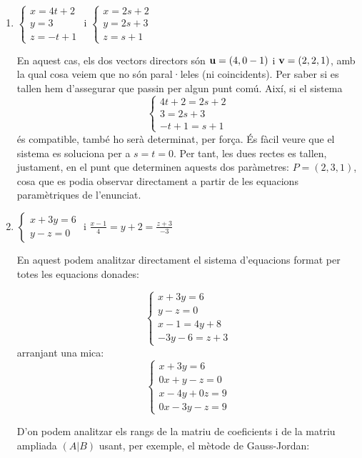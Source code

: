 \begin{enumerate}
  \item $\begin{cases}x=4t+2\\y=3\\z=-t+1\end{cases}$ i $\begin{cases}x=2s+2\\y=2s+3\\z=s+1\end{cases}$

En aquest cas, els dos vectors directors són $\textbf{u}=(4,0-1)$ i $\textbf{v}=(2,2,1)$, amb la qual cosa veiem que no són paral·leles (ni coincidents). Per saber si es tallen hem d'assegurar que passin per algun punt comú. Així, si el sistema
\[
\begin{cases}4t+2=2s+2\\3=2s+3\\-t+1=s+1\end{cases}
\]
és compatible, també ho serà determinat, per força. És fàcil veure que el sistema es soluciona per a $s=t=0$. Per tant, les dues rectes es tallen, justament, en el punt que determinen aquests dos paràmetres: $P=(2,3,1)$, cosa que es podia observar directament a partir de les equacions paramètriques de l'enunciat.
\blacksquare

  \item $\begin{cases}x+3y=6\\y-z=0\end{cases}$ i $\frac{x-1}{4}=y+2=\frac{z+3}{-3}$

En aquest podem analitzar directament el sistema d'equacions format per totes les equacions donades:

\[
\begin{cases}
  x+3y=6\\
  y-z=0\\
  x-1=4y+8\\
  -3y-6=z+3
\end{cases}
\]
arranjant una mica:
\[
\begin{cases}
  x+3y=6\\
  0x+y-z=0\\
  x-4y+0z=9\\
  0x-3y-z=9
\end{cases}
\]

D'on podem analitzar els rangs de la matriu de coeficients i de la matriu ampliada $(A|B)$ usant, per exemple, el mètode de Gauss-Jordan:


\end{enumerate}
